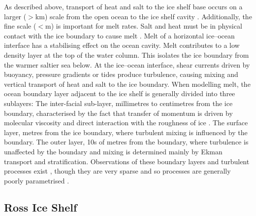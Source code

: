 As described above, transport of heat and salt to the ice shelf base occurs on a  larger ($>$km) scale from the open ocean to the ice shelf cavity \citep{holland1999modeling}. Additionally, the fine scale ($<$m) is important for melt rates. Salt and heat must be in physical contact with the ice boundary to cause melt \citep[e.g.][]{jenkins2010observation}. 
Melt of a horizontal ice--ocean interface has a stabilising effect on the ocean cavity. Melt contributes to a low density layer at the top of the water column. This isolates the ice boundary from the warmer saltier sea below. At the ice--ocean interface, shear currents driven by buoyancy, pressure gradients or tides produce turbulence, causing mixing and vertical transport of heat and salt to the ice boundary. When modelling melt, the ocean boundary layer adjacent to the ice shelf is generally divided into three sublayers: The inter-facial sub-layer, millimetres to centimetres from the ice boundary, characterised by the fact that transfer of momentum is driven by molecular viscosity and direct interaction with the roughness of ice \citep{jenkins2010observation}. 
The surface layer, metres from the ice boundary, where turbulent mixing is influenced by the boundary. The outer layer, 10s of metres from the boundary, where turbulence is unaffected by the boundary and mixing is determined mainly by Ekman transport and stratification. Observations of these boundary layers and turbulent processes exist \citep[e.g.][]{jenkins2010observation,davis2019turbulence}, though they are very sparse and so processes are generally poorly parametrised \citep[e.g.][]{jenkins2010observation,malyarenko2020synthesis}.
 

\newpage
\subsection{Ross Ice Shelf} \label{ross_ice_shelf}


